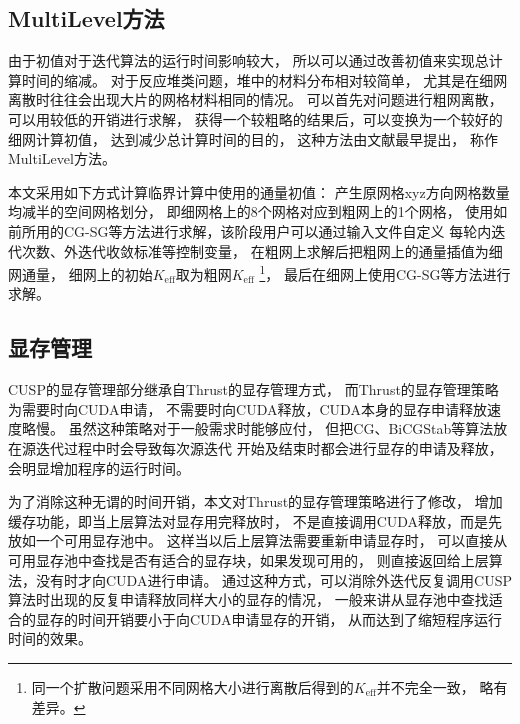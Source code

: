 \subsection{MultiLevel方法}
\label{sec:equsolve.multimesh}

由于初值对于迭代算法的运行时间影响较大，
所以可以通过改善初值来实现总计算时间的缩减。
对于反应堆类问题，堆中的材料分布相对较简单，
尤其是在细网离散时往往会出现大片的网格材料相同的情况。
可以首先对问题进行粗网离散，可以用较低的开销进行求解，
获得一个较粗略的结果后，可以变换为一个较好的细网计算初值，
达到减少总计算时间的目的，
这种方法由文献最早提出，
称作MultiLevel方法。

本文采用如下方式计算临界计算中使用的通量初值：
产生原网格xyz方向网格数量均减半的空间网格划分，
即细网格上的8个网格对应到粗网上的1个网格，
使用如前所用的CG-SG等方法进行求解，该阶段用户可以通过输入文件自定义
每轮内迭代次数、外迭代收敛标准等控制变量，
在粗网上求解后把粗网上的通量插值为细网通量，
细网上的初始$K_\mathrm{eff}$取为粗网$K_\mathrm{eff}$%
\footnote{同一个扩散问题采用不同网格大小进行离散后得到的$K_\mathrm{eff}$并不完全一致，
略有差异。}，
最后在细网上使用CG-SG等方法进行求解。

\subsection{显存管理}

CUSP的显存管理部分继承自Thrust的显存管理方式，
而Thrust的显存管理策略为需要时向CUDA申请，
不需要时向CUDA释放，CUDA本身的显存申请释放速度略慢。
虽然这种策略对于一般需求时能够应付，
但把CG、BiCGStab等算法放在源迭代过程中时会导致每次源迭代
开始及结束时都会进行显存的申请及释放，
会明显增加程序的运行时间。

为了消除这种无谓的时间开销，本文对Thrust的显存管理策略进行了修改，
增加缓存功能，即当上层算法对显存用完释放时，
不是直接调用CUDA释放，而是先放如一个可用显存池中。
这样当以后上层算法需要重新申请显存时，
可以直接从可用显存池中查找是否有适合的显存块，如果发现可用的，
则直接返回给上层算法，没有时才向CUDA进行申请。
通过这种方式，可以消除外迭代反复调用CUSP算法时出现的反复申请释放同样大小的显存的情况，
一般来讲从显存池中查找适合的显存的时间开销要小于向CUDA申请显存的开销，
从而达到了缩短程序运行时间的效果。

